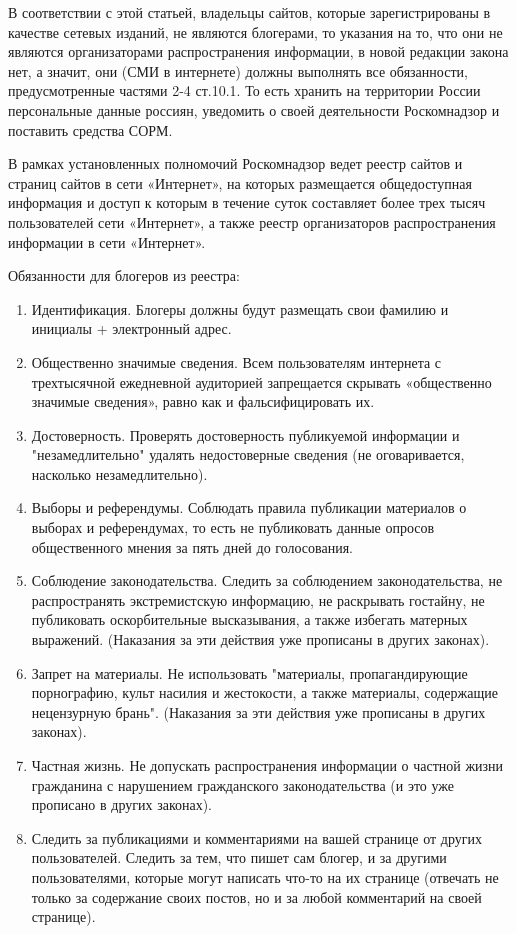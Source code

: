 \documentclass[14pt,a4paper,report]{article}
\begin{document}
В соответствии с этой статьей, владельцы сайтов, которые зарегистрированы в качестве сетевых изданий, не являются блогерами, то указания на то, что они не являются организаторами распространения информации, в новой редакции закона нет, а значит, они (СМИ в интернете) должны выполнять все обязанности, предусмотренные частями 2-4 ст.10.1. То есть хранить на территории России персональные данные россиян, уведомить о своей деятельности Роскомнадзор и поставить средства СОРМ.

В рамках установленных полномочий Роскомнадзор ведет реестр сайтов и страниц сайтов в сети «Интернет», на которых размещается общедоступная информация и доступ к которым в течение суток составляет более трех тысяч пользователей сети «Интернет», а также реестр организаторов распространения информации в сети «Интернет».

Обязанности для блогеров из реестра:

\begin{enumerate}
\item Идентификация. Блогеры должны будут размещать свои фамилию и инициалы + электронный адрес.
\item Общественно значимые сведения. Всем пользователям интернета с трехтысячной ежедневной аудиторией запрещается скрывать «общественно значимые сведения», равно как и фальсифицировать их.
\item Достоверность. Проверять достоверность публикуемой информации и "незамедлительно" удалять недостоверные сведения (не оговаривается, насколько незамедлительно).
\item Выборы и референдумы. Соблюдать правила публикации материалов о выборах и референдумах, то есть не публиковать данные опросов общественного мнения за пять дней до голосования.
\item Соблюдение законодательства. Следить за соблюдением законодательства, не распространять экстремистскую информацию, не раскрывать гостайну, не публиковать оскорбительные высказывания, а также избегать матерных выражений. (Наказания за эти действия уже прописаны в других законах).
\item Запрет на материалы. Не использовать "материалы, пропагандирующие порнографию, культ насилия и жестокости, а также материалы, содержащие нецензурную брань". (Наказания за эти действия уже прописаны в других законах).

\item Частная жизнь. Не допускать распространения информации о частной жизни гражданина с нарушением гражданского законодательства (и это уже прописано в других законах).

\item Следить за публикациями и комментариями на вашей странице от других пользователей. Следить за тем, что пишет сам блогер, и за другими пользователями, которые могут написать что-то на их странице (отвечать не только за содержание своих постов, но и за любой комментарий на своей странице).
\end{enumerate}
\end{document}

